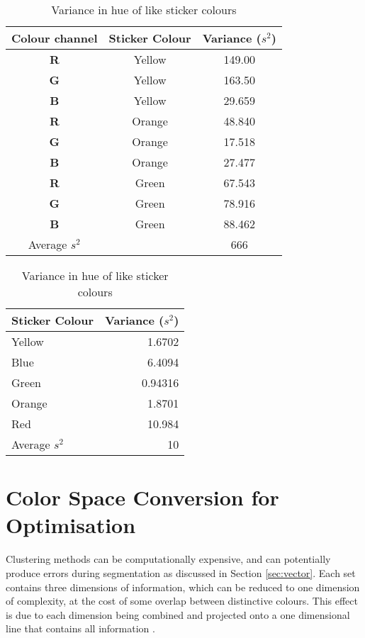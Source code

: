 \documentclass[11pt, a4paper, oneside]{Thesis} %
\begin{document}
\begin{table}[htbp]
  \begin{minipage}[b]{0.5\linewidth}
    \centering
    \begin{tabular}{c c c}
    \hline
    Colour channel & Sticker Colour & Variance ($s^2$)\\
    \hline
    \textbf{R} & Yellow & 149.00 \\ 
    \textbf{G} & Yellow & 163.50 \\ 
    \textbf{B} & Yellow & 29.659 \\ 
    \textbf{R} & Orange & 48.840 \\ 
    \textbf{G} & Orange & 17.518 \\ 
    \textbf{B} & Orange & 27.477 \\ 
    \textbf{R} & Green & 67.543 \\ 
    \textbf{G} & Green & 78.916 \\ 
    \textbf{B} & Green & 88.462 \\ 
    \hline \hline
    Average $s^2$ & & 666 \\
  \end{tabular}
  \caption{Variance in \textbf{RGB} values of like sticker colours}
  \label{tab:rgb_var}
  \end{minipage}
  \hspace{0.5cm}
  \begin{minipage}[b]{0.5\linewidth}
    \centering
    \begin{tabular}{l r}
    \hline
    Sticker Colour & Variance ($s^2$)\\
    \hline
    Yellow & 1.6702 \\ 
    Blue & 6.4094 \\ 
    Green & 0.94316 \\ 
    Orange & 1.8701 \\ 
    Red & 10.984 \\
    \hline \hline
    Average $s^2$ & 10
  \end{tabular}
  \caption{Variance in hue of like sticker colours}
  \label{tab:hue_var}    
  \end{minipage}
\end{table}


\section{Color Space Conversion for Optimisation}
Clustering methods can be computationally expensive, and can potentially produce errors during segmentation as discussed in Section \ref{sec:vector}. Each set contains three dimensions of information, which can be reduced to one dimension of complexity, at the cost of some overlap between distinctive colours. This effect is due to each dimension being combined and projected onto a one dimensional line that contains all information \cite{celenk1991colour}.\\
\end{document}
